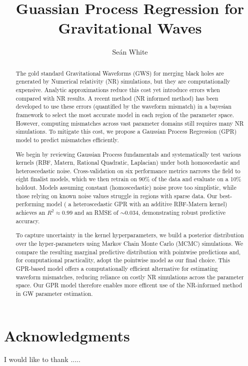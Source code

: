 \documentclass{ucdgradtaughtthesis}
\title{Guassian Process Regression for Gravitational Waves}
\author{Seán White}
\begin{document}
\pagestyle{plain}


\maketitle

\begin{abstract}
    The gold standard Gravitational Waveforms (GWS) for merging black holes are generated by Numerical relativity (NR) simulations, but they are computationally expensive. 
    Analytic approximations reduce this cost yet introduce errors when compared with NR results. A recent method (NR informed method) has been developed to use these errors (quantified by the waveform mismatch) in a bayesian framework to select the most accurate model in each region of the parameter space.
    However, computing mismatches across vast parameter domains still requires many NR simulations. To mitigate this cost, we propose a Gaussian Process Regression (GPR) model to predict mismatches efficiently.

    We begin by reviewing Gaussian Process fundamentals and systematically test various kernels (RBF, Matern, Rational Quadratic, Laplacian) under both homoscedastic and heteroscedastic noise. 
    Cross-validation on six performance metrics narrows the field to eight finalist models, which we then retrain on 90\% of the data and evaluate on a 10\% holdout. 
    Models assuming constant (homoscedastic) noise prove too simplistic, while those relying on known noise values struggle in regions with sparse data. 
    Our best-performing model ( a heteroscedastic GPR with an additive RBF-Matern kernel) achieves an \(R^2 \approx 0.99\) and an RMSE of \(\sim 0.034\), demonstrating robust predictive accuracy.

    To capture uncertainty in the kernel hyperparameters, we build a posterior distribution over the hyper-parameters using Markov Chain Monte Carlo (MCMC) simulations. 
    We compare the resulting marginal predictive distribution with pointwise predictions and, for computational practicality, adopt the pointwise model as our final choice. 
    This GPR-based model offers a computationally efficient alternative for estimating waveform mismatches, reducing reliance on costly NR simulations across the parameter space. 
    Our GPR model therefore enables more efficent use of the NR-informed method in GW parameter estimation.
\end{abstract}
    

\chapter*{Acknowledgments}
I would like to thank .....
\end{document}
